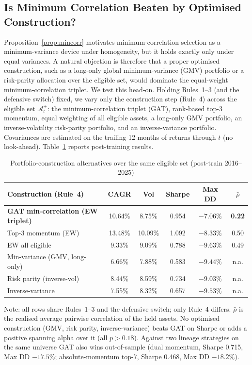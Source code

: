 \subsection{Is Minimum Correlation Beaten by Optimised Construction?}
\label{sec:res_construction}

Proposition~\ref{prop:mincorr} motivates minimum-correlation selection as a
minimum-variance device under homogeneity, but it holds exactly only under equal
variances. A natural objection is therefore that a proper optimised
construction, such as a long-only global minimum-variance (GMV) portfolio or a
risk-parity allocation over the eligible set, would dominate the equal-weight
minimum-correlation triplet. We test this head-on. Holding Rules~1--3 (and the
defensive switch) fixed, we vary only the construction step (Rule~4) across
the eligible set $\mathcal{A}_t^+$: the minimum-correlation triplet (GAT),
rank-based top-3 momentum, equal weighting of all eligible assets, a long-only GMV
portfolio, an inverse-volatility risk-parity portfolio, and an inverse-variance
portfolio. Covariances are estimated on the trailing 12 months of returns through
$t$ (no look-ahead). Table~\ref{tab:construction} reports post-training results.

\begin{table}[H]
\centering
\caption{Portfolio-construction alternatives over the same eligible set (post-train 2016--2025)}
\label{tab:construction}
\small
\begin{tabular}{lccccc}
\toprule
Construction (Rule~4) & CAGR & Vol & Sharpe & Max DD & $\bar\rho$ \\
\midrule
\textbf{GAT min-correlation (EW triplet)} & 10.64\% & 8.75\% & 0.954 & \textbf{$-7.06\%$} & \textbf{0.22} \\
Top-3 momentum (EW)            & 13.48\% & 10.09\% & 1.092 & $-8.33\%$ & 0.50 \\
EW all eligible                & 9.33\%  & 9.09\%  & 0.788 & $-9.63\%$ & 0.49 \\
Min-variance (GMV, long-only)  & 6.66\%  & 7.88\%  & 0.583 & $-9.44\%$ & n.a. \\
Risk parity (inverse-vol)      & 8.44\%  & 8.59\%  & 0.734 & $-9.03\%$ & n.a. \\
Inverse-variance               & 7.55\%  & 8.32\%  & 0.657 & $-9.53\%$ & n.a. \\
\bottomrule
\end{tabular}
\begin{flushleft}
\footnotesize
Note: all rows share Rules~1--3 and the defensive switch; only Rule~4 differs.
$\bar\rho$ is the realised average pairwise correlation of the held assets. No
optimised construction (GMV, risk parity, inverse-variance) beats GAT on Sharpe or
adds a positive spanning alpha over it (all $p>0.18$). Against two lineage
strategies on the same universe GAT also wins out-of-sample (dual momentum, Sharpe
0.715, Max DD $-17.5\%$; absolute-momentum top-7, Sharpe 0.468, Max DD $-18.2\%$).
\end{flushleft}
\end{table}

